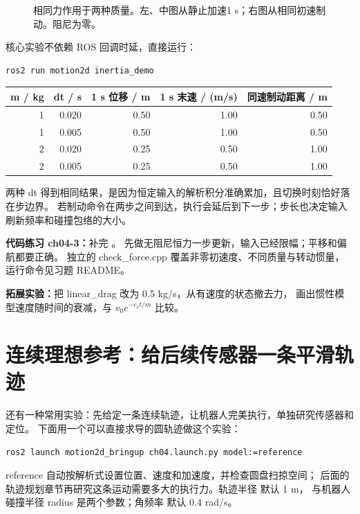 \begin{figure}[ht]
\centering

\caption{相同力作用于两种质量。左、中图从静止加速1 s；右图从相同初速制动。阻尼为零。}
\end{figure}

核心实验不依赖 ROS 回调时延，直接运行：
\begin{lstlisting}[language=bash,numbers=none]
ros2 run motion2d inertia_demo
\end{lstlisting}
\begin{center}
\begin{tabular}{rrrrr}
\toprule
m / kg & dt / s & 1 s 位移 / m & 1 s 末速 / (m/s) & 同速制动距离 / m\\
\midrule
1 & 0.020 & 0.50 & 1.00 & 0.50\\
1 & 0.005 & 0.50 & 1.00 & 0.50\\
2 & 0.020 & 0.25 & 0.50 & 1.00\\
2 & 0.005 & 0.25 & 0.50 & 1.00\\
\bottomrule
\end{tabular}
\end{center}
两种 dt 得到相同结果，是因为恒定输入的解析积分准确累加，且切换时刻恰好落在步边界。
若制动命令在两步之间到达，执行会延后到下一步；步长也决定输入刷新频率和碰撞包络的大小。

\textbf{代码练习 ch04-3：}补完 。
先做无阻尼恒力一步更新，输入已经限幅；平移和偏航都要正确。
独立的 check\_force.cpp 覆盖非零初速度、不同质量与转动惯量，运行命令见习题 README。

\textbf{拓展实验：}把 linear\_drag 改为 0.5 kg/s，从有速度的状态撤去力，
画出惯性模型速度随时间的衰减，与 $v_0e^{-c_vt/m}$ 比较。
\section{连续理想参考：给后续传感器一条平滑轨迹}
还有一种常用实验：先给定一条连续轨迹，让机器人完美执行，单独研究传感器和定位。
下面用一个可以直接求导的圆轨迹做这个实验：
\begin{lstlisting}[language=bash,numbers=none]
ros2 launch motion2d_bringup ch04.launch.py model:=reference
\end{lstlisting}
reference 自动按解析式设置位置、速度和加速度，并检查圆盘扫掠空间；
后面的轨迹规划章节再研究这条运动需要多大的执行力。轨迹半径  默认 1 m，
与机器人碰撞半径 radius 是两个参数；角频率  默认 0.4 rad/s。

